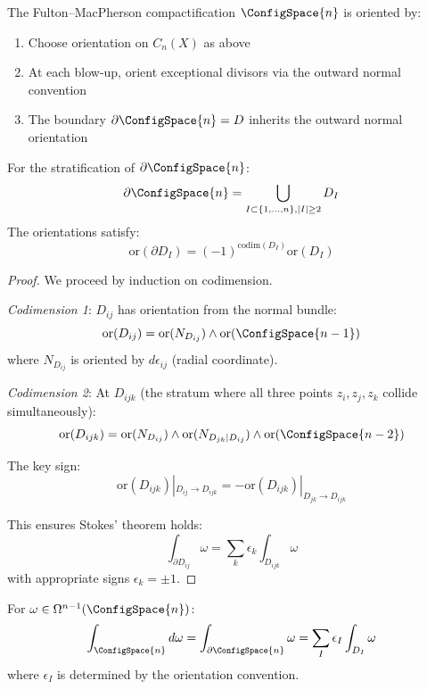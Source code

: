 \begin{definition}
The Fulton--MacPherson compactification $\ConfigSpace{n}$ is oriented by:
\begin{enumerate}
\item Choose orientation on $C_n(X)$ as above
\item At each blow-up, orient exceptional divisors via the outward normal convention
\item The boundary $\partial\ConfigSpace{n} = D$ inherits the outward normal orientation
\end{enumerate}
\end{definition}

\begin{lemma}
\label{lem:orientation-compatibility}
For the stratification of $\partial\ConfigSpace{n}$:
\[\partial\ConfigSpace{n} = \bigcup_{I \subset \{1,\ldots,n\}, |I| \geq 2} D_I\]
The orientations satisfy:
\[\text{or}(\partial D_I) = (-1)^{\text{codim}(D_I)} \text{or}(D_I)\]
\end{lemma}

\begin{proof}
We proceed by induction on codimension.

\emph{Codimension 1}: $D_{ij}$ has orientation from the normal bundle:
\[\text{or}(D_{ij}) = \text{or}(N_{D_{ij}}) \wedge \text{or}(\ConfigSpace{n-1})\]
where $N_{D_{ij}}$ is oriented by $d\epsilon_{ij}$ (radial coordinate).

\emph{Codimension 2}: At $D_{ijk}$ (the stratum where all three points $z_i, z_j, z_k$ collide simultaneously):
\[\text{or}(D_{ijk}) = \text{or}(N_{D_{ij}}) \wedge \text{or}(N_{D_{jk}|D_{ij}}) \wedge \text{or}(\ConfigSpace{n-2})\]

The key sign:
\[\text{or}(D_{ijk})|_{D_{ij} \to D_{ijk}} = -\text{or}(D_{ijk})|_{D_{jk} \to D_{ijk}}\]

This ensures Stokes' theorem holds:
\[\int_{\partial D_{ij}} \omega = \sum_{k} \epsilon_k \int_{D_{ijk}} \omega\]
with appropriate signs $\epsilon_k = \pm 1$.
\end{proof}

\begin{theorem}
\label{thm:stokes-config-spaces}
For $\omega \in \Omega^{n-1}(\ConfigSpace{n})$:
\[\int_{\ConfigSpace{n}} d\omega = \int_{\partial\ConfigSpace{n}} \omega = \sum_{I} \epsilon_I \int_{D_I} \omega\]
where $\epsilon_I$ is determined by the orientation convention.
\end{theorem}

